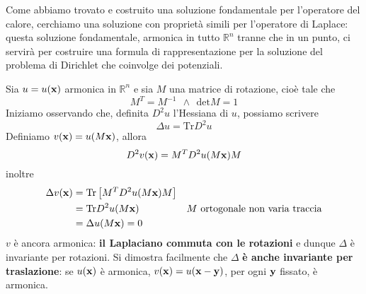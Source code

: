 Come abbiamo trovato e costruito una soluzione fondamentale per l'operatore del calore, cerchiamo una soluzione con proprietà simili per l'operatore di Laplace: questa soluzione fondamentale, armonica in tutto $\displaystyle \mathbb{R}^{n}$ tranne che in un punto, ci servirà per costruire una formula di rappresentazione per la soluzione del problema di Dirichlet che coinvolge dei potenziali.

Sia $\displaystyle u=u(\mathbf{x})$ armonica in $\displaystyle \mathbb{R}^{n}$ e sia $M$ una matrice di rotazione, cioè tale che
\begin{equation*}
    M^{T} =M^{-1} \ \ \land \ \ \mathrm{det} M=1
\end{equation*}
Iniziamo osservando che, definita $\displaystyle D^{2} u$ l'Hessiana di $u$, possiamo scrivere
\begin{equation*}
    \Delta u=\mathrm{Tr} D^{2} u
\end{equation*}
Definiamo $v(\mathbf{x}) =u(M\mathbf{x})$, allora
\begin{equation*}
    D^{2} v(\mathbf{x}) =M^{T} D^{2} u(M\mathbf{x}) M
\end{equation*}
inoltre
\begin{align*}
    \Delta v(\mathbf{x}) & =\mathrm{Tr}\left[ M^{T} D^{2} u(M\mathbf{x}) M\right] &                                        \\
                 & =\mathrm{Tr} D^{2} u(M\mathbf{x})                      & M\ \text{ortogonale non varia traccia} \\
                 & =\Delta u(M\mathbf{x}) =0                              &
\end{align*}
$v$ è ancora armonica: \textbf{il Laplaciano commuta con le rotazioni} e dunque $\Delta $ è invariante per rotazioni. Si dimostra facilmente che $\Delta $ \textbf{è anche invariante per traslazione}: se $u(\mathbf{x})$ è armonica, $v(\mathbf{x}) =u(\mathbf{x}-\mathbf{y})$, per ogni $\mathbf{y}$ fissato, è armonica.

